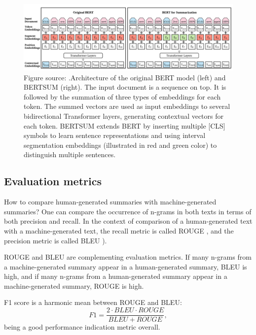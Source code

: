 \documentclass[11pt]{article}
\begin{document}
\begin{figure}[!h]
\centering
\includegraphics[scale = 0.4]{../figures/bert.png}
\caption{Figure source: \citet{liu2019text}.Architecture of the original BERT model (left) and BERTSUM (right). The input document is a sequence on top. It is followed by the summation of three types of embeddings for each token. The summed vectors are used
as input embeddings to several bidirectional Transformer layers, generating contextual vectors for each token. BERTSUM extends BERT by inserting multiple [CLS] symbols to learn sentence representations and using interval segmentation embeddings (illustrated in red and green color) to distinguish multiple sentences.\label{fig:bert}}
\end{figure}


\subsection{Evaluation metrics}

How to compare human-generated summaries with machine-generated summaries? One can compare the occurrence of n-grams \citep{lin2003automatic} in both texts in terms of both precision and recall. In the context of comparison of a human-generated text with a machine-generated text, the recall metric is called ROUGE \citep{lin2003automatic}, and the precision metric is called BLEU \citep{papineni2002bleu}). 

ROUGE and BLEU are complementing evaluation metrics. If many n-grams from a machine-generated summary appear in a human-generated summary, BLEU is high, and if many n-grams from a human-generated summary appear in a machine-generated summary, ROUGE is high.

F1 score is a harmonic mean between ROUGE and BLEU:
\begin{equation}
 F1 = \frac{2\cdot BLEU \cdot ROUGE}{BLEU + ROUGE},
 \label{eq:f1}
\end{equation}
being a good performance indication metric overall.
\end{document}
